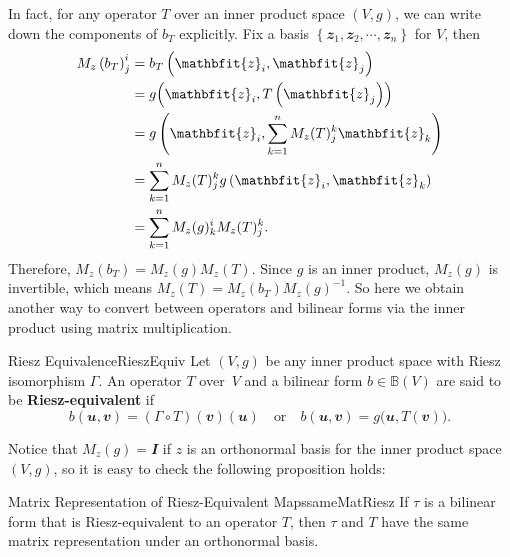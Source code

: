 \documentclass[math]{amznotes}
\theoremstyle{remark}
\newcommand{\I}{\mathbfit{I}}
\begin{document}
    In fact, for any operator $T$ over an inner product space $(V, g)$, we can write down the components of $b_T$ explicitly. Fix a basis $\left\{\mathbfit{z}_1, \mathbfit{z}_2, \cdots, \mathbfit{z}_n\right\}$ for $V$, then 
    \begin{align*}
        M_z\left(b_T\right)^i_j & = b_T\left(\mathbfit{z}_i, \mathbfit{z}_j\right) \\
        & = g\Bigl(\mathbfit{z}_i, T\left(\mathbfit{z}_j\right)\Bigr) \\
        & = g\left(\mathbfit{z}_i, \sum_{k = 1}^{n}M_z(T)^k_j\mathbfit{z}_k\right) \\
        & = \sum_{k = 1}^{n}M_z(T)^k_jg\left(\mathbfit{z}_i, \mathbfit{z}_k\right) \\
        & = \sum_{k = 1}^{n}M_z(g)^i_kM_z(T)^k_j.
    \end{align*}
    Therefore, $M_z\left(b_T\right) = M_z(g)M_z(T)$. Since $g$ is an inner product, $M_z(g)$ is invertible, which means $M_z(T) = M_z\left(b_T\right)M_z(g)^{-1}$. So here we obtain another way to convert between operators and bilinear forms via the inner product using matrix multiplication.
    \begin{dfnbox}{Riesz Equivalence}{RieszEquiv}
        Let $(V, g)$ be any inner product space with Riesz isomorphism $\Gamma$. An operator $T$ over~$V$ and a bilinear form $b \in \mathbb{B}(V)$ are said to be {\color{red} \textbf{Riesz-equivalent}} if 
        \begin{equation*}
            b(\mathbfit{u}, \mathbfit{v}) = (\Gamma \circ T)(\mathbfit{v})(\mathbfit{u}) \quad \textrm{or} \quad b(\mathbfit{u}, \mathbfit{v}) = g\bigl(\mathbfit{u}, T(\mathbfit{v})\bigr).
        \end{equation*} 
    \end{dfnbox}
    Notice that $M_z(g) = \I$ if $z$ is an orthonormal basis for the inner product space $(V, g)$, so it is easy to check the following proposition holds:
    \begin{probox}{Matrix Representation of Riesz-Equivalent Maps}{sameMatRiesz}
        If $\tau$ is a bilinear form that is Riesz-equivalent to an operator $T$, then $\tau$ and $T$ have the same matrix representation under an orthonormal basis.
    \end{probox}
\end{document}
